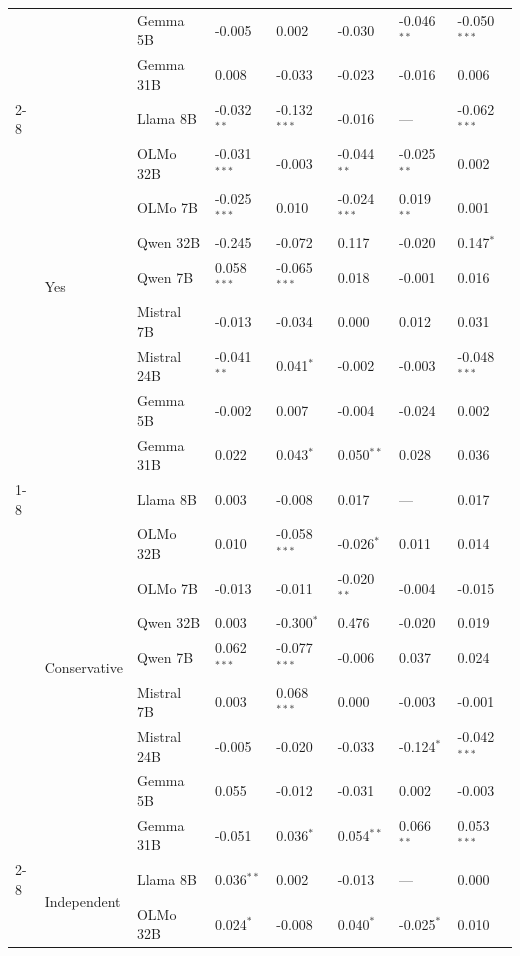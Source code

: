 \begin{longtable}[t]{llllllll}
 &  & Gemma 5B & -0.005 & 0.002 & -0.030 & -0.046$^{**}$ & -0.050$^{***}$ \\
 &  & Gemma 31B & 0.008 & -0.033 & -0.023 & -0.016 & 0.006 \\
\cline{2-8}
 & \multirow[t]{9}{*}{Yes} & Llama 8B & -0.032$^{**}$ & -0.132$^{***}$ & -0.016 & --- & -0.062$^{***}$ \\
 &  & OLMo 32B & -0.031$^{***}$ & -0.003 & -0.044$^{**}$ & -0.025$^{**}$ & 0.002 \\
 &  & OLMo 7B & -0.025$^{***}$ & 0.010 & -0.024$^{***}$ & 0.019$^{**}$ & 0.001 \\
 &  & Qwen 32B & -0.245 & -0.072 & 0.117 & -0.020 & 0.147$^{*}$ \\
 &  & Qwen 7B & 0.058$^{***}$ & -0.065$^{***}$ & 0.018 & -0.001 & 0.016 \\
 &  & Mistral 7B & -0.013 & -0.034 & 0.000 & 0.012 & 0.031 \\
 &  & Mistral 24B & -0.041$^{**}$ & 0.041$^{*}$ & -0.002 & -0.003 & -0.048$^{***}$ \\
 &  & Gemma 5B & -0.002 & 0.007 & -0.004 & -0.024 & 0.002 \\
 &  & Gemma 31B & 0.022 & 0.043$^{*}$ & 0.050$^{**}$ & 0.028 & 0.036 \\
\cline{1-8} \cline{2-8}
\multirow[t]{45}{*}{Political Affiliation} & \multirow[t]{9}{*}{Conservative} & Llama 8B & 0.003 & -0.008 & 0.017 & --- & 0.017 \\
 &  & OLMo 32B & 0.010 & -0.058$^{***}$ & -0.026$^{*}$ & 0.011 & 0.014 \\
 &  & OLMo 7B & -0.013 & -0.011 & -0.020$^{**}$ & -0.004 & -0.015 \\
 &  & Qwen 32B & 0.003 & -0.300$^{*}$ & 0.476 & -0.020 & 0.019 \\
 &  & Qwen 7B & 0.062$^{***}$ & -0.077$^{***}$ & -0.006 & 0.037 & 0.024 \\
 &  & Mistral 7B & 0.003 & 0.068$^{***}$ & 0.000 & -0.003 & -0.001 \\
 &  & Mistral 24B & -0.005 & -0.020 & -0.033 & -0.124$^{*}$ & -0.042$^{***}$ \\
 &  & Gemma 5B & 0.055 & -0.012 & -0.031 & 0.002 & -0.003 \\
 &  & Gemma 31B & -0.051 & 0.036$^{*}$ & 0.054$^{**}$ & 0.066$^{**}$ & 0.053$^{***}$ \\
\cline{2-8}
 & \multirow[t]{9}{*}{Independent} & Llama 8B & 0.036$^{**}$ & 0.002 & -0.013 & --- & 0.000 \\
 &  & OLMo 32B & 0.024$^{*}$ & -0.008 & 0.040$^{*}$ & -0.025$^{*}$ & 0.010 \\

\end{longtable}
